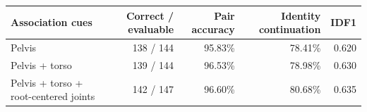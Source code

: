 \begin{tabular}{lrrrr}
  \toprule
  Association cues & Correct / evaluable & Pair accuracy & Identity continuation & IDF1 \\
  \midrule
  Pelvis & 138 / 144 & 95.83\% & 78.41\% & 0.620 \\
  Pelvis + torso & 139 / 144 & 96.53\% & 78.98\% & 0.630 \\
  Pelvis + torso + root-centered joints & 142 / 147 & 96.60\% & 80.68\% & 0.635 \\
  \bottomrule
\end{tabular}
